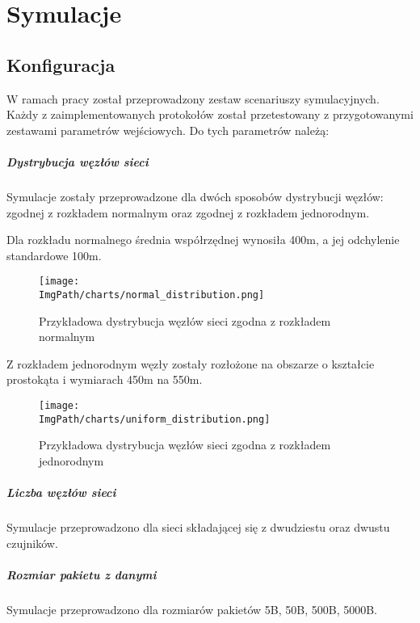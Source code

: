 \chapter{Symulacje}
\section{Konfiguracja}
W ramach pracy został przeprowadzony zestaw scenariuszy symulacyjnych. Każdy z zaimplementowanych protokołów został przetestowany z przygotowanymi zestawami parametrów wejściowych.
Do tych parametrów należą:
\paragraph{Dystrybucja węzłów sieci}
Symulacje zostały przeprowadzone dla dwóch sposobów dystrybucji węzłów: zgodnej z rozkładem normalnym oraz zgodnej z rozkładem jednorodnym.

Dla rozkładu normalnego średnia współrzędnej wynosiła 400m, a jej odchylenie standardowe 100m.

\begin{figure}[H]
	\begin{center}
		\texttt{[image: \\ImgPath/charts/normal\_distribution.png]}
	\end{center}
	\caption{Przykładowa dystrybucja węzłów sieci zgodna z rozkładem normalnym}
\end{figure}

Z rozkładem jednorodnym węzły zostały rozłożone na obszarze o kształcie prostokąta i wymiarach 450m na 550m.

\begin{figure}[H]
	\begin{center}
		\texttt{[image: \\ImgPath/charts/uniform\_distribution.png]}
	\end{center}
	\caption{Przykładowa dystrybucja węzłów sieci zgodna z rozkładem jednorodnym}
\end{figure}

\paragraph{Liczba węzłów sieci}
Symulacje przeprowadzono dla sieci składającej się z dwudziestu oraz dwustu czujników.
\paragraph{Rozmiar pakietu z danymi}
Symulacje przeprowadzono dla rozmiarów pakietów 5B, 50B, 500B, 5000B.
